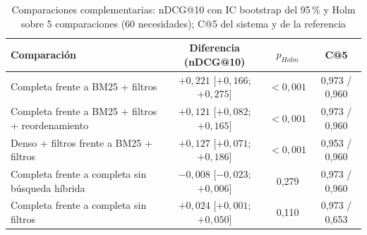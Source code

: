 \begin{table}[htbp!]
    \centering
    \caption{Comparaciones complementarias: nDCG@10 con IC bootstrap del 95\,\% y Holm sobre 5 comparaciones (60 necesidades); C@5 del sistema y de la referencia}
    \label{tab:res-posthoc}
    \small
    \begin{tabular}{|>{\raggedright\arraybackslash}p{5.3cm}|c|c|c|}
        \hline
        \textbf{Comparación} & \textbf{Diferencia (nDCG@10)} & \textbf{$p_{Holm}$} & \textbf{C@5} \\
        \hline
        Completa frente a BM25 + filtros & $+0{,}221$ [$+0{,}166$; $+0{,}275$] & $< 0{,}001$ & 0{,}973 / 0{,}960 \\
        \hline
        Completa frente a BM25 + filtros + reordenamiento & $+0{,}121$ [$+0{,}082$; $+0{,}165$] & $< 0{,}001$ & 0{,}973 / 0{,}960 \\
        \hline
        Denso + filtros frente a BM25 + filtros & $+0{,}127$ [$+0{,}071$; $+0{,}186$] & $< 0{,}001$ & 0{,}953 / 0{,}960 \\
        \hline
        Completa frente a completa sin búsqueda híbrida & $-0{,}008$ [$-0{,}023$; $+0{,}006$] & 0{,}279 & 0{,}973 / 0{,}960 \\
        \hline
        Completa frente a completa sin filtros & $+0{,}024$ [$+0{,}001$; $+0{,}050$] & 0{,}110 & 0{,}973 / 0{,}653 \\
        \hline
    \end{tabular}
\end{table}
